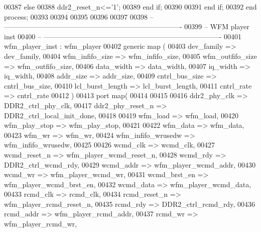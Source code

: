 \begin{DoxyCode}
00387         \textcolor{keywordflow}{else} 
00388             \textcolor{vhdlchar}{ddr2_reset_n}\textcolor{vhdlchar}{<=}\textcolor{vhdlchar}{'}\textcolor{vhdllogic}{}\textcolor{vhdllogic}{1}\textcolor{vhdlchar}{'};
00389         \textcolor{keywordflow}{end} \textcolor{keywordflow}{if};
00390         
00391     \textcolor{keywordflow}{end} \textcolor{keywordflow}{if};         
00392 \textcolor{keywordflow}{end} \textcolor{keywordflow}{process};
00393 
00394 
00395 
00396 
00397 
00398 \textcolor{keyword}{-- ----------------------------------------------------------------------------}
00399 \textcolor{keyword}{-- WFM player inst}
00400 \textcolor{keyword}{-- ----------------------------------------------------------------------------}
00401 wfm_player_inst : wfm_player
00402     \textcolor{keywordflow}{generic} \textcolor{keywordflow}{map} (
00403             dev_family          => dev_family, 
00404             wfm_infifo_size => wfm_infifo_size,
00405             wfm_outfifo_size    => wfm_outfifo_size,
00406             data_width          => data_width, 
00407             iq_width                => iq_width, 
00408             addr_size           => addr_size, 
00409             cntrl_bus_size      => cntrl_bus_size,
00410             lcl_burst_length    => lcl_burst_length,
00411             cntrl_rate          => cntrl_rate 
00412 \textcolor{vhdlchar}{)}
00413   \textcolor{keywordflow}{port} \textcolor{keywordflow}{map}(
00414 
00415 
00416         ddr2_phy_clk            => DDR2_ctrl_phy_clk,
00417         ddr2_phy_reset_n        => DDR2_ctrl_local_init_done,
00418 
00419         wfm_load                    => wfm_load,
00420         wfm_play_stop           => wfm_play_stop,
00421 
00422         wfm_data                    => wfm_data,
00423         wfm_wr                  => wfm_wr,
00424         wfm_infifo_wrusedw  => wfm_infifo_wrusedw,
00425 
00426         wcmd_clk                    => wcmd_clk,
00427         wcmd_reset_n            => wfm_player_wcmd_reset_n,
00428         wcmd_rdy                    => DDR2_ctrl_wcmd_rdy,
00429         wcmd_addr               => wfm_player_wcmd_addr,
00430         wcmd_wr                 => wfm_player_wcmd_wr,
00431         wcmd_brst_en            => wfm_player_wcmd_brst_en,
00432         wcmd_data               => wfm_player_wcmd_data,
00433         rcmd_clk                    => rcmd_clk,
00434         rcmd_reset_n            => wfm_player_rcmd_reset_n,
00435         rcmd_rdy                    => DDR2_ctrl_rcmd_rdy,
00436         rcmd_addr               => wfm_player_rcmd_addr,
00437         rcmd_wr                 => wfm_player_rcmd_wr,

\end{DoxyCode}

